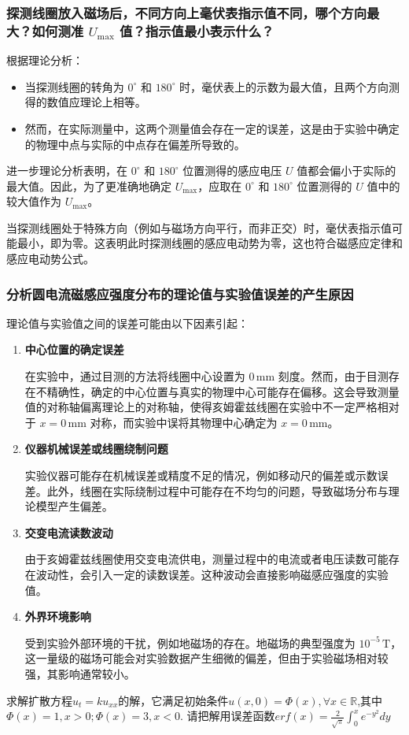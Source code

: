 \documentclass[UTF-8,twoside,cs4size]{ctexart}
\begin{document}
\subsubsection{探测线圈放入磁场后，不同方向上毫伏表指示值不同，哪个方向最大？如何测准 $U_{\max}$ 值？指示值最小表示什么？}
根据理论分析：
\begin{itemize}
    \item 当探测线圈的转角为 $0^\circ$ 和 $180^\circ$ 时，毫伏表上的示数为最大值，且两个方向测得的数值应理论上相等。
    \item 然而，在实际测量中，这两个测量值会存在一定的误差，这是由于实验中确定的物理中点与实际的中点存在偏差所导致的。
\end{itemize}

进一步理论分析表明，在 $0^\circ$ 和 $180^\circ$ 位置测得的感应电压 $U$ 值都会偏小于实际的最大值。因此，为了更准确地确定 $U_{\max}$，应取在 $0^\circ$ 和 $180^\circ$ 位置测得的 $U$ 值中的较大值作为 $U_{\max}$。 \par

当探测线圈处于特殊方向（例如与磁场方向平行，而非正交）时，毫伏表指示值可能最小，即为零。这表明此时探测线圈的感应电动势为零，这也符合磁感应定律和感应电动势公式。

\subsubsection{分析圆电流磁感应强度分布的理论值与实验值误差的产生原因}
理论值与实验值之间的误差可能由以下因素引起：
\begin{enumerate}
    \item \textbf{中心位置的确定误差} \par
    在实验中，通过目测的方法将线圈中心设置为 $0 \, \mathrm{mm}$ 刻度。然而，由于目测存在不精确性，确定的中心位置与真实的物理中心可能存在偏移。这会导致测量值的对称轴偏离理论上的对称轴，使得亥姆霍兹线圈在实验中不一定严格相对于 $x = 0 \, \mathrm{mm}$ 对称，而实验中误将其物理中心确定为 $x = 0 \, \mathrm{mm}$。

    \item \textbf{仪器机械误差或线圈绕制问题} \par
    实验仪器可能存在机械误差或精度不足的情况，例如移动尺的偏差或示数误差。此外，线圈在实际绕制过程中可能存在不均匀的问题，导致磁场分布与理论模型产生偏差。

    \item \textbf{交变电流读数波动} \par
    由于亥姆霍兹线圈使用交变电流供电，测量过程中的电流或者电压读数可能存在波动性，会引入一定的读数误差。这种波动会直接影响磁感应强度的实验值。

    \item \textbf{外界环境影响} \par
    受到实验外部环境的干扰，例如地磁场的存在。地磁场的典型强度为 $10^{-5} \, \mathrm{T}$，这一量级的磁场可能会对实验数据产生细微的偏差，但由于实验磁场相对较强，其影响通常较小。
\end{enumerate}
求解扩散方程$u_t = ku_{xx}$的解，它满足初始条件$u(x,0)=\Phi (x), \forall x\in \mathbb{R} $,其中$\Phi (x) = 1,  x > 0; \Phi (x) = 3, x < 0.$
请把解用误差函数$erf(x)=\frac{2}{\sqrt{\pi}}\int_0^x e^{-y^2}dy$
\end{document}
